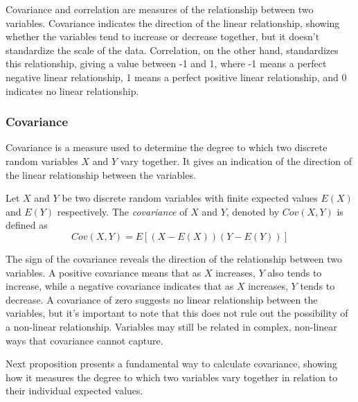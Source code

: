 Covariance and correlation are measures of the relationship between two variables. Covariance indicates the direction of the linear relationship, showing whether the variables tend to increase or decrease together, but it doesn't standardize the scale of the data. Correlation, on the other hand, standardizes this relationship, giving a value between -1 and 1, where -1 means a perfect negative linear relationship, 1 means a perfect positive linear relationship, and 0 indicates no linear relationship.


\subsubsection*{Covariance}

Covariance is a measure used to determine the degree to which two discrete random variables \(X\) and \(Y\) vary together. It gives an indication of the direction of the linear relationship between the variables.

\begin{definition}
Let $X$ and $Y$ be two discrete random variables with finite expected values $E(X)$ and $E(Y)$ respectively. The \emph{covariance} of $X$ and $Y$, denoted by $Cov\left(X, Y\right)$ is defined as
\[
Cov\left(X, Y\right) = E\left[\left(X- E(X) \right) \left(Y - E(Y) \right) \right]
\]
\end{definition}

The sign of the covariance reveals the direction of the relationship between two variables. A positive covariance means that as \(X\) increases, \(Y\) also tends to increase, while a negative covariance indicates that as \(X\) increases, \(Y\) tends to decrease. A covariance of zero suggests no linear relationship between the variables, but it’s important to note that this does not rule out the possibility of a non-linear relationship. Variables may still be related in complex, non-linear ways that covariance cannot capture.

Next proposition presents a fundamental way to calculate covariance, showing how it measures the degree to which two variables vary together in relation to their individual expected values.

